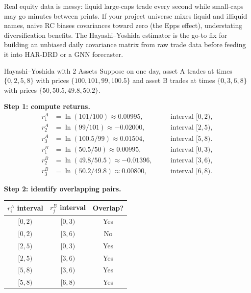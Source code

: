 \begin{projectconnection}
Real equity data is messy: liquid large-caps trade every second while
small-caps may go minutes between prints. If your project universe mixes
liquid and illiquid names, naive RC biases covariances toward zero (the Epps
effect), understating diversification benefits. The Hayashi--Yoshida estimator
is the go-to fix for building an unbiased daily covariance matrix from raw
trade data before feeding it into HAR-DRD or a GNN forecaster.
\end{projectconnection}

\begin{workedexample}{Hayashi--Yoshida with 2 Assets}
Suppose on one day, asset A trades at times $\{0, 2, 5, 8\}$ with prices
$\{100, 101, 99, 100.5\}$ and asset B trades at times $\{0, 3, 6, 8\}$ with
prices $\{50, 50.5, 49.8, 50.2\}$.

\textbf{Step 1: compute returns.}
\begin{align*}
  r_1^A &= \ln(101/100) \approx 0.00995, &\quad &\text{interval } [0,2), \\
  r_2^A &= \ln(99/101) \approx -0.02000, &\quad &\text{interval } [2,5), \\
  r_3^A &= \ln(100.5/99) \approx 0.01504, &\quad &\text{interval } [5,8). \\[4pt]
  r_1^B &= \ln(50.5/50) \approx 0.00995, &\quad &\text{interval } [0,3), \\
  r_2^B &= \ln(49.8/50.5) \approx -0.01396, &\quad &\text{interval } [3,6), \\
  r_3^B &= \ln(50.2/49.8) \approx 0.00800, &\quad &\text{interval } [6,8).
\end{align*}

\textbf{Step 2: identify overlapping pairs.}
\begin{center}
\begin{tabular}{ccc}
\toprule
$r_i^A$ interval & $r_j^B$ interval & Overlap? \\
\midrule
$[0,2)$ & $[0,3)$ & Yes \\
$[0,2)$ & $[3,6)$ & No  \\
$[2,5)$ & $[0,3)$ & Yes \\
$[2,5)$ & $[3,6)$ & Yes \\
$[5,8)$ & $[3,6)$ & Yes \\
$[5,8)$ & $[6,8)$ & Yes \\
\bottomrule
\end{tabular}
\end{center}


\end{workedexample}
